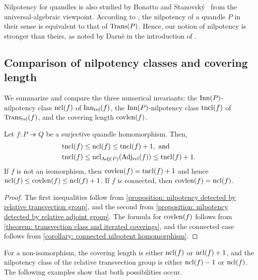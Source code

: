 \begin{rem}
    Nilpotency for quandles is also studied by Bonatto and Stanovsk\'{y}~\cite{bonatto_stanovsky_2021_commutator_theory_for_racks_and_quandles} from the universal-algebraic viewpoint. According to \cite[Theorem 1.2]{bonatto_stanovsky_2021_commutator_theory_for_racks_and_quandles}, the nilpotency of a quandle $P$ in their sense is equivalent to that of $\operatorname{Trans}(P)$. Hence, our notion of nilpotency is stronger than theirs, as noted by Darn\'{e} in the introduction of \cite{darne_2026_nilpotent_quandles}.
\end{rem}


 
\subsection{Comparison of nilpotency classes and covering length}
\label{subsection: Comparison of nilpotency classes and covering length}

We summarize and compare the three numerical invariants: the $\operatorname{Inn}(P)$-nilpotency class $\operatorname{ncl}(f)$ of $\operatorname{Inn_{rel}}(f)$, the $\operatorname{Inn}(P)$-nilpotency class $\operatorname{tncl}(f)$ of $\operatorname{Trans_{rel}}(f)$, and the covering length $\operatorname{covlen}(f)$.

\begin{thm}
\label{theorem: comparison of ncl tncl covlen}
Let $f\colon P\twoheadrightarrow Q$ be a surjective quandle homomorphism. Then,
\begin{align*}
    \operatorname{tncl}(f)&\leq \operatorname{ncl}(f)\leq \operatorname{tncl}(f)+1,\text{ and} \\
    \operatorname{tncl}(f)&\leq\operatorname{ncl}_{\operatorname{Adj}(P)}(\operatorname{Adj_{rel}}(f))\leq\operatorname{tncl}(f)+1.
\end{align*}
If $f$ is not an isomorphism, then $\operatorname{covlen}(f)=\operatorname{tncl}(f)+1$ and hence $\operatorname{ncl}(f) \leq\operatorname{covlen}(f) \leq\operatorname{ncl}(f)+1$.
If $f$ is connected, then $\operatorname{covlen}(f)=\operatorname{ncl}(f)$.
\end{thm}

\begin{proof}
The first inequalities follow from \cref{proposition: nilpotency detected by relative transvection group}, and the second from \cref{proposition: nilpotency detected by relative adjoint group}.
The formula for $\operatorname{covlen}(f)$ follows from \cref{theorem: transvection class and iterated coverings}, and the connected case follows from \cref{corollary: connected nilpotent homomorphism}.
\end{proof}



For a non-isomorphism, the covering length is either $\operatorname{ncl}(f)$ or $\operatorname{ncl}(f)+1$, and the nilpotency class of the relative transvection group is either $\operatorname{ncl}(f)-1$ or $\operatorname{ncl}(f)$. The following examples show that both possibilities occur.


